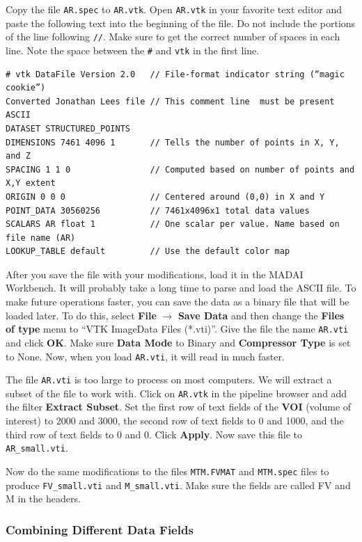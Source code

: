 \documentclass[12pt]{article}
\newcommand{\filter}[1]{\textbf{#1}}
\newcommand{\menu}[1]{\textbf{#1}}
\newcommand{\file}[1]{\texttt{#1}}
\newcommand{\setting}[1]{\textbf{#1}}
\begin{document}
Copy the file \file{AR.spec} to \file{AR.vtk}. Open \file{AR.vtk} in your favorite text editor and paste the following text into the beginning of the file. Do not include the portions of the line following \verb+//+. Make sure to get the correct number of spaces in each line. Note the space between the \verb+#+ and \verb+vtk+ in the first line.

\begin{verbatim}
# vtk DataFile Version 2.0   // File-format indicator string (“magic cookie”)
Converted Jonathan Lees file // This comment line  must be present
ASCII
DATASET STRUCTURED_POINTS 
DIMENSIONS 7461 4096 1       // Tells the number of points in X, Y, and Z 
SPACING 1 1 0                // Computed based on number of points and X,Y extent
ORIGIN 0 0 0                 // Centered around (0,0) in X and Y
POINT_DATA 30560256          // 7461x4096x1 total data values
SCALARS AR float 1           // One scalar per value. Name based on file name (AR)
LOOKUP_TABLE default         // Use the default color map
\end{verbatim}

After you save the file with your modifications, load it in the MADAI Workbench. It will probably take a long time to parse and load the ASCII file. To make future operations faster, you can save the data as a binary file that will be loaded later. To do this, select \menu{File} $\rightarrow$ \menu{Save Data} and then change the \setting{Files of type} menu to ``VTK ImageData Files (*.vti)''. Give the file the name \file{AR.vti} and click \setting{OK}. Make sure \setting{Data Mode} to Binary and \setting{Compressor Type} is set to None. Now, when you load \file{AR.vti}, it will read in much faster.

The file \file{AR.vti} is too large to process on most computers. We will extract a subset of the file to work with. Click on \file{AR.vtk} in the pipeline browser and add the filter \filter{Extract Subset}. Set the first row of text fields of the \setting{VOI} (volume of interest) to 2000 and 3000, the second row of text fields to 0 and 1000, and the third row of text fields to 0 and 0. Click \setting{Apply}. Now save this file to \file{AR\_small.vti}.

Now do the same modifications to the files \file{MTM.FVMAT} and \file{MTM.spec} files to produce \file{FV\_small.vti} and \file{M\_small.vti}. Make sure the fields are called FV and M in the headers.

\subsubsection{Combining Different Data Fields}
\end{document}

